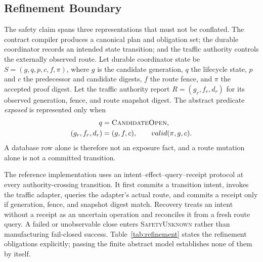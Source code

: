 \documentclass[letterpaper,twocolumn,10pt]{article}
\begin{document}
\subsection{Refinement Boundary}
The safety claim spans three representations that must not be conflated.  The
contract compiler produces a canonical plan and obligation set; the durable
coordinator records an intended state transition; and the traffic authority
controls the externally observed route.  Let durable coordinator state be
$S=(g,q,p,c,f,\pi)$, where $g$ is the candidate generation, $q$ the lifecycle
state, $p$ and $c$ the predecessor and candidate digests, $f$ the route fence,
and $\pi$ the accepted proof digest.  Let the traffic authority report
$R=(g_r,f_r,d_r)$ for its observed generation, fence, and route snapshot
digest.  The abstract predicate \emph{exposed} is represented only when
\begin{equation*}
\begin{aligned}
q &= \textsc{CandidateOpen}, \\
(g_r,f_r,d_r) &= (g,f,c), \qquad valid(\pi,g,c).
\end{aligned}
\end{equation*}
A database row alone is therefore not an exposure fact, and a route mutation
alone is not a committed transition.

The reference implementation uses an intent--effect--query--receipt protocol
at every authority-crossing transition.  It first commits a transition intent,
invokes the traffic adapter, queries the adapter's actual route, and commits a
receipt only if generation, fence, and snapshot digest match.  Recovery treats
an intent without a receipt as an uncertain operation and reconciles it from a
fresh route query.  A failed or unobservable close enters \textsc{SafetyUnknown}
rather than manufacturing fail-closed success.  Table~\ref{tab:refinement}
states the refinement obligations explicitly; passing the finite abstract
model establishes none of them by itself.
\end{document}
